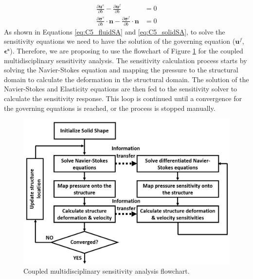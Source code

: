 %
%
\begin{subequations}\label{eq:C5_FSIconstraintsSA}
\begin{align}
	\frac{\partial \mathbf{u}^s}{\partial b} - 
	\frac{\partial \mathbf{u}^f}{\partial b} &= 0
	\\
	\frac{\partial \mathbf{\sigma}^s}{\partial b} \cdot \mathbf{n} - 
	\frac{\partial \mathbf{\sigma}^f}{\partial b} \cdot \mathbf{n} &= 0
\end{align}
\end{subequations}
%
As shown in Equations \eqref{eq:C5_fluidSA} and \eqref{eq:C5_solidSA}, to solve the sensitivity equations we need to have the solution of the governing equation ($\mathbf{u}^f$, $\mathbf{\epsilon^s}$). Therefore, we are proposing to use the flowchart of Figure \ref{fig:C5_SAflowchart} for the coupled multidisciplinary sensitivity analysis. The sensitivity calculation process starts by solving the Navier-Stokes equation and mapping the pressure to the structural domain to calculate the deformation in the structural domain. The solution of the Navier-Stokes and Elasticity equations are then fed to the sensitivity solver to calculate the sensitivity response. This loop is continued until a convergence for the governing equations is reached, or the process is stopped manually. 
%
\begin{figure}[H]
    \centering
    \includegraphics[width=14.00cm]{Chapter_5/figure/couple_SA_flowchart.jpg}
    \caption{Coupled multidisciplinary sensitivity analysis flowchart.}
    \label{fig:C5_SAflowchart}
\end{figure}
%